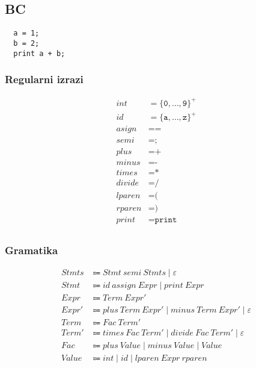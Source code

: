 \documentclass{report}
\newcommand{\Null}{\varepsilon}
\newcommand{\Char}[1]{\texttt{#1}}
\newcommand{\Spc}{\ }
\newcommand{\Union}{\mathrel{|}}
\newcommand{\KleenePlus}[1]{#1^+}
\newcommand{\Arrow}{\Coloneq}
\newcommand{\NT}[1]{{#1}}
\newcommand{\T}[1]{{#1}}
\begin{document}
\subsection{BC}
\begin{verbatim}
  a = 1;
  b = 2;
  print a + b;
\end{verbatim}

\subsubsection*{Regularni izrazi}
\begin{equation*}
  \begin{aligned}
    \T{int} &= \KleenePlus{\{\Char{0}, \dots, \Char{9}\}}\\
    \T{id} &= \KleenePlus{\{\Char{a}, \dots, \Char{z}\}}\\
    \T{asign} &= \Char{=}\\
    \T{semi} &= \Char{;}\\
    \T{plus} &= \Char{+}\\
    \T{minus} &= \Char{-}\\
    \T{times} &= \Char{*}\\
    \T{divide} &= \Char{/}\\
    \T{lparen} &= \Char{(}\\
    \T{rparen} &= \Char{)}\\
    \T{print} &= \Char{print}\\
  \end{aligned}
\end{equation*}

\subsubsection*{Gramatika}
\begin{equation*}
  \begin{aligned}
    \NT{Stmts} &\Arrow \NT{Stmt} \Spc \T{semi} \Spc \NT{Stmts} \Union \Null\\
    \NT{Stmt} &\Arrow \T{id} \Spc \T{assign} \Spc \NT{Expr} \Union \T{print} \Spc \NT{Expr}\\
    \NT{Expr} &\Arrow \NT{Term} \Spc \NT{Expr'}\\
    \NT{Expr'} &\Arrow \T{plus} \Spc \NT{Term} \Spc \NT{Expr'} \Union \T{minus} \Spc \NT{Term} \Spc \NT{Expr'} \Union \Null\\
    \NT{Term} &\Arrow \NT{Fac} \Spc \NT{Term'}\\
    \NT{Term'} &\Arrow \T{times} \Spc \NT{Fac} \Spc \NT{Term'} \Union \T{divide} \Spc \NT{Fac} \Spc \NT{Term'} \Union \Null\\
    \NT{Fac} &\Arrow \T{plus} \Spc \NT{Value} \Union \T{minus} \Spc \NT{Value} \Union \NT{Value}\\
    \NT{Value} &\Arrow \T{int} \Union \T{id} \Union \T{lparen} \Spc \NT{Expr} \Spc \T{rparen}
  \end{aligned}
\end{equation*}
\end{document}
